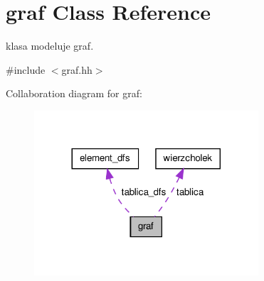 \hypertarget{classgraf}{\section{graf \-Class \-Reference}
\label{classgraf}
}


klasa modeluje graf.  




{\ttfamily \#include $<$graf.\-hh$>$}



\-Collaboration diagram for graf\-:
\nopagebreak
\begin{figure}[H]
\begin{center}
\leavevmode
\includegraphics[width=236pt]{classgraf__coll__graph}
\end{center}
\end{figure}
